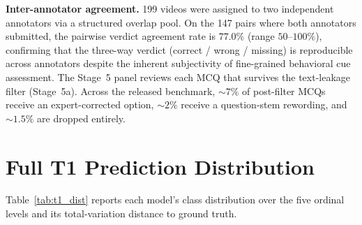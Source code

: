 \documentclass{article}
\begin{document}
\noindent\textbf{Inter-annotator agreement.} 199 videos were assigned to two independent annotators via a structured overlap pool. On the 147 pairs where both annotators submitted, the pairwise verdict agreement rate is $77.0\%$ (range $50$--$100\%$), confirming that the three-way verdict (correct / wrong / missing) is reproducible across annotators despite the inherent subjectivity of fine-grained behavioral cue assessment.
The Stage~5 panel reviews each MCQ that survives the text-leakage filter (Stage~5a). Across the released benchmark, $\sim\!7\%$ of post-filter MCQs receive an expert-corrected option, $\sim\!2\%$ receive a question-stem rewording, and $\sim\!1.5\%$ are dropped entirely.

\section{Full T1 Prediction Distribution}
\label{app:t1_dist}

Table~\ref{tab:t1_dist} reports each model's class distribution over the five ordinal levels and its total-variation distance to ground truth.
\end{document}
